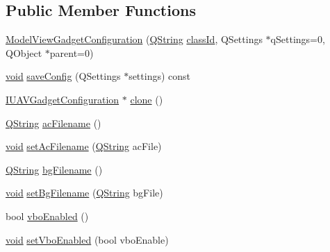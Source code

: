 \subsection*{Public Member Functions}
\begin{DoxyCompactItemize}
\item 
\hyperlink{group___model_view_plugin_ga68c5b45bcb3a5b4f35186957e765e343}{Model\-View\-Gadget\-Configuration} (\hyperlink{group___u_a_v_objects_plugin_gab9d252f49c333c94a72f97ce3105a32d}{Q\-String} \hyperlink{group___core_plugin_gac953657221ba7fda967ada0408332641}{class\-Id}, Q\-Settings $\ast$q\-Settings=0, Q\-Object $\ast$parent=0)
\item 
\hyperlink{group___u_a_v_objects_plugin_ga444cf2ff3f0ecbe028adce838d373f5c}{void} \hyperlink{group___model_view_plugin_gaa2ed9dd347aecb4518cf716e3fbd9288}{save\-Config} (Q\-Settings $\ast$settings) const 
\item 
\hyperlink{group___core_plugin_gacdfdf0b1e39b5002472b76b6564ce51f}{I\-U\-A\-V\-Gadget\-Configuration} $\ast$ \hyperlink{group___model_view_plugin_gafe85c40e0602f4bb0a8f54637fd87b2c}{clone} ()
\item 
\hyperlink{group___u_a_v_objects_plugin_gab9d252f49c333c94a72f97ce3105a32d}{Q\-String} \hyperlink{group___model_view_plugin_ga38f0d11e16e59ffff87290b2a222468e}{ac\-Filename} ()
\item 
\hyperlink{group___u_a_v_objects_plugin_ga444cf2ff3f0ecbe028adce838d373f5c}{void} \hyperlink{group___model_view_plugin_ga5a6c75e6ec1963b48ad4cd6fd1f80e67}{set\-Ac\-Filename} (\hyperlink{group___u_a_v_objects_plugin_gab9d252f49c333c94a72f97ce3105a32d}{Q\-String} ac\-File)
\item 
\hyperlink{group___u_a_v_objects_plugin_gab9d252f49c333c94a72f97ce3105a32d}{Q\-String} \hyperlink{group___model_view_plugin_ga1d269e09831fb3fd6187c831b3b516b1}{bg\-Filename} ()
\item 
\hyperlink{group___u_a_v_objects_plugin_ga444cf2ff3f0ecbe028adce838d373f5c}{void} \hyperlink{group___model_view_plugin_gac9bccdbb077005f2bb94cfc7c9dfefaa}{set\-Bg\-Filename} (\hyperlink{group___u_a_v_objects_plugin_gab9d252f49c333c94a72f97ce3105a32d}{Q\-String} bg\-File)
\item 
bool \hyperlink{group___model_view_plugin_ga82f3e4d2137def4ff8aa56abc69d3bce}{vbo\-Enabled} ()
\item 
\hyperlink{group___u_a_v_objects_plugin_ga444cf2ff3f0ecbe028adce838d373f5c}{void} \hyperlink{group___model_view_plugin_gad35eb4d4a2a27f015e4e54b18e3b2b97}{set\-Vbo\-Enabled} (bool vbo\-Enable)
\end{DoxyCompactItemize}


